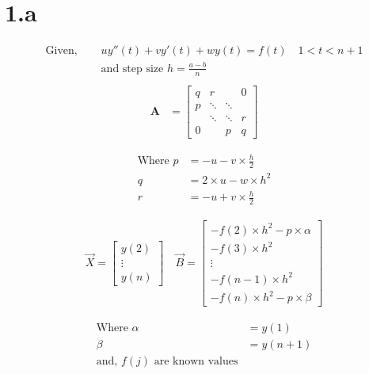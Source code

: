 \documentclass[letterpaper,12pt,titlepage,oneside,final]{book}
\newcommand{\matr}[1]{\mathbf{#1}} %
\begin{document}





\section*{1.a}
\begin{align*}
\text{Given, }\quad & u y''(t) + v y'(t) + w y(t) = f(t) \quad 1 < t < n+1 \\
&\text{and step size }h =\frac{a-b}{n}\\
\end{align*}
\begin{align*}
\matr{A} &= \begin{bmatrix}
	q & r & & 0\\
	p & \ddots & \ddots &  \\
	& \ddots & \ddots &  r \\
	0 &  & p & q  \end{bmatrix}
\end{align*}

\begin{align*}
\text{Where } p &= -u- v \times \frac{h}{2} \quad \\
q &= 2\times u - w\times h^2\\
r &= -u + v \times \frac{h}{2}
\end{align*}

\begin{align*}
\vec{X} = \begin{bmatrix}
	y(2) \\
	\vdots\\
	y(n) \end{bmatrix} \quad
\vec{B} = \begin{bmatrix}
	-f(2)\times h^2 -p\times \alpha \\
	-f(3)\times h^2\\
	\vdots\\
	-f(n-1)\times h^2\\
	-f(n)\times h^2 -p\times \beta \end{bmatrix}
\end{align*}

\begin{align*}
\text{Where } \alpha &= y(1) \quad \\
\beta &= y(n+1)\\
\text{and, } f(j) \text{ are known values}
\end{align*}
\cleardoublepage
\end{document}
